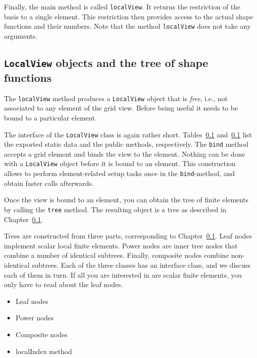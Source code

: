 \documentclass[a4paper,10pt,headings=normal,bibliography=totoc]{scrartcl}
\newcommand{\cpp}[1]{\lstinline[basicstyle=\ttfamily]!#1!}
\begin{document}
Finally, the main method is called \cpp{localView}.  It returns the restriction of the basis
to a single element.  This restriction then provides access to the actual shape functions and
their numbers.  Note that the method \cpp{localView} does not take any arguments.

\subsection{\texorpdfstring{\cpp{LocalView}}{LocalView} objects and the tree of shape functions}

The \cpp{localView}
method produces a \cpp{LocalView} object that is {\em free}, i.e., not associated to any
element of the grid view.  Before being useful it needs to be bound to a particular element.

The interface of the \cpp{LocalView} class is again rather short.  Tables~\ref{}
and~\ref{} list the exported static data and the public methods, respectively.
The \cpp{bind} method accepts a grid element and binds the view to the element.  Nothing can be done with a
\cpp{LocalView} object before it is bound to an element.  This construction allows to perform element-related
setup tasks once in the \cpp{bind}-method, and obtain faster calls afterwards.

Once the view is bound to an element, you can obtain the tree of finite elements by calling the \cpp{tree}
method.  The resulting object is a tree as described in Chapter~\ref{}.

Trees are constructed from three parts, corresponding to Chapter~\ref{}.
Leaf nodes implement scalar local finite elements.  Power nodes are inner tree nodes that combine a number
of identical subtrees.  Finally, composite nodes combine non-identical subtrees.  Each of the three classes
has an interface class, and we discuss each of them in turn.  If all you are interested in are
scalar finite elements, you only have to read about the leaf nodes.

\begin{itemize}
 \item Leaf nodes
 \item Power nodes
 \item Composite nodes
 \item localIndex method
\end{itemize}
\end{document}

